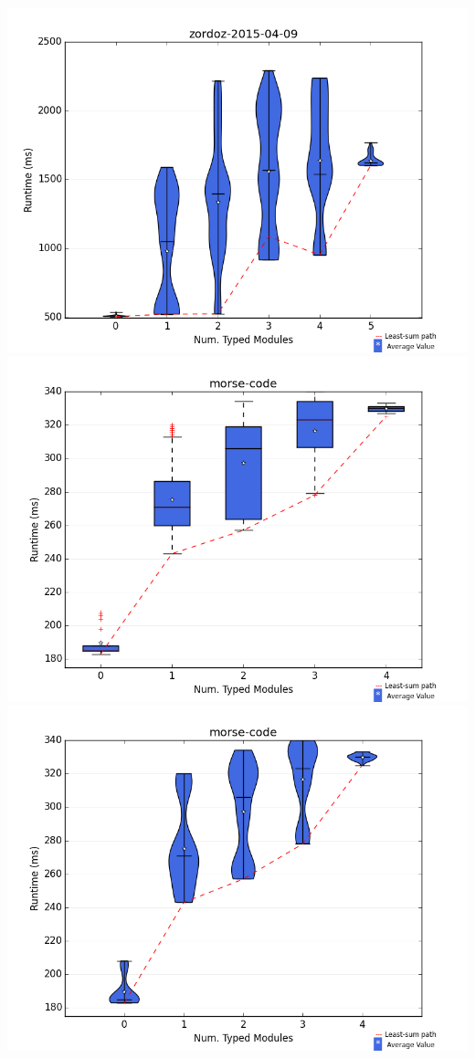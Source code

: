 \documentclass{article}
\begin{document}
\includegraphics[width=\textwidth]{violins/zordoz-2015-04-09-violin.png}
\newpage
\includegraphics[width=\textwidth]{boxplots/morse-code-boxplot.png}
\includegraphics[width=\textwidth]{violins/morse-code-violin.png}
\end{document}
